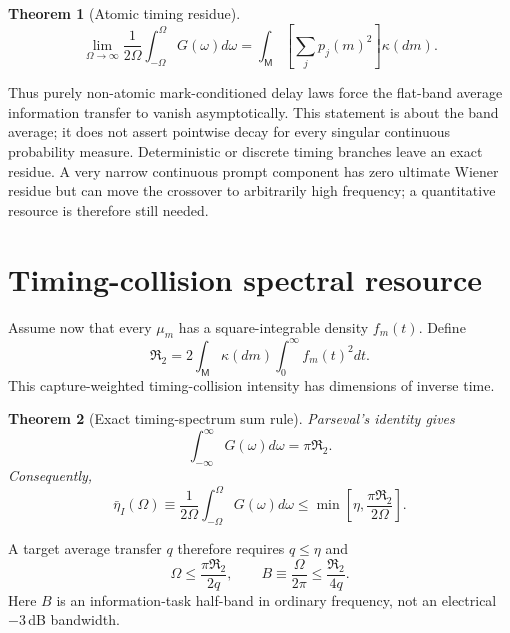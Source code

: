 \documentclass[aps,prapplied,preprint,nofootinbib]{revtex4-2}
\newtheorem{theorem}{Theorem}
\newcommand{\Rtwo}{\mathfrak R_2}
\newcommand{\M}{\mathsf M}
\begin{document}
\begin{theorem}[Atomic timing residue]
\begin{equation}
\boxed{
\lim_{\Omega\to\infty}\frac{1}{2\Omega}
\int_{-\Omega}^{\Omega}G(\omega)d\omega
=\int_{\M}\left[\sum_jp_j(m)^2\right]\kappa(dm).}
\label{eq:atomic}
\end{equation}
\end{theorem}

Thus purely non-atomic mark-conditioned delay laws force the flat-band average information transfer to vanish asymptotically. This statement is about the band average; it does not assert pointwise decay for every singular continuous probability measure. Deterministic or discrete timing branches leave an exact residue. A very narrow continuous prompt component has zero ultimate Wiener residue but can move the crossover to arbitrarily high frequency; a quantitative resource is therefore still needed.

\section{Timing-collision spectral resource}

Assume now that every $\mu_m$ has a square-integrable density $f_m(t)$. Define
\begin{equation}
\boxed{
\Rtwo=2\int_{\M}\kappa(dm)\int_0^\infty f_m(t)^2dt.}
\label{eq:R2}
\end{equation}
This capture-weighted timing-collision intensity has dimensions of inverse time.

\begin{theorem}[Exact timing-spectrum sum rule]
Parseval's identity gives
\begin{equation}
\boxed{
\int_{-\infty}^{\infty}G(\omega)d\omega=\pi\Rtwo.}
\label{eq:parseval}
\end{equation}
Consequently,
\begin{equation}
\boxed{
\bar\eta_I(\Omega)
\equiv\frac{1}{2\Omega}\int_{-\Omega}^{\Omega}G(\omega)d\omega
\le\min\left[\eta,\frac{\pi\Rtwo}{2\Omega}\right].}
\label{eq:flat}
\end{equation}
\end{theorem}

A target average transfer $q$ therefore requires $q\le\eta$ and
\begin{equation}
\Omega\le\frac{\pi\Rtwo}{2q},
\qquad
B\equiv\frac{\Omega}{2\pi}\le\frac{\Rtwo}{4q}.
\end{equation}
Here $B$ is an information-task half-band in ordinary frequency, not an electrical $-3\,$dB bandwidth.
\end{document}
